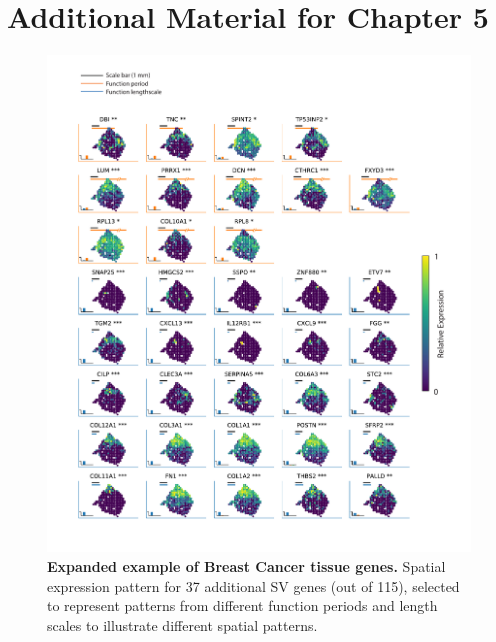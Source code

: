 
\chapter{Additional Material for Chapter 5}

\graphicspath{{Appendix4/Figs/}}

\begin{figure}
    \centering
    \includegraphics[width=\textwidth]{"SuppFig1"}
    \caption[Expanded example of Breast Cancer tissue genes]{\textbf{Expanded example of Breast Cancer tissue genes.} Spatial expression pattern for 37 additional SV genes (out of 115), selected to represent patterns from different function periods and length scales to illustrate different spatial patterns.}
    \label{fig:ss1}
\end{figure}

